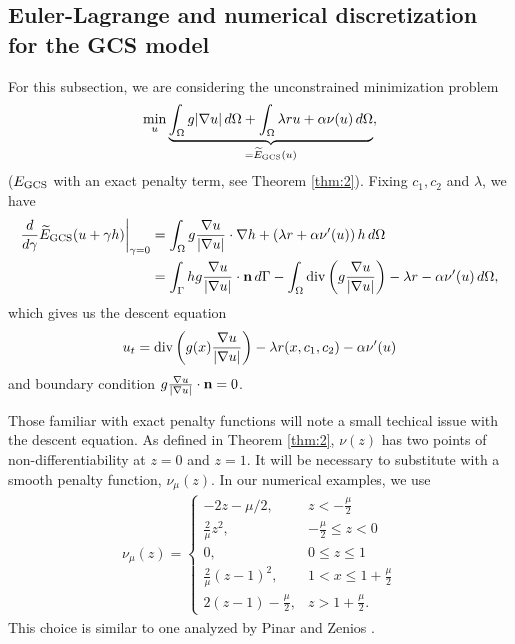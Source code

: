 \subsection{Euler-Lagrange and numerical discretization for the GCS model}
For this subsection, we are considering the unconstrained minimization problem 
\begin{align*}
\min_u \underbrace{\int_{\Omega } g\lvert\nabla u\rvert \,d\Omega 
+ \int_{\Omega} \lambda r u + \alpha \nu(u) \,d\Omega }_{=\widetilde E_{\textrm{GCS}}(u)},
\end{align*}
($E_\textrm{GCS}$ with an exact penalty term, see Theorem \ref{thm:2}).
Fixing $c_1, c_2$ and $\lambda$, we have
\begin{align*}
\frac{d}{d\gamma} \widetilde E_\textrm{GCS}(u + \gamma h)
\bigg\rvert_{\gamma = 0} 
&= \int_{\Omega} g \frac{\nabla u}{\lvert\nabla u\rvert} \cdot \nabla h
+ \left( \lambda r + \alpha \nu'(u) \right) h \,d\Omega 
\\
&= \int_{\Gamma} h g \frac{\nabla u}{\lvert\nabla u\rvert} \cdot \mathbf{n}  \, d \Gamma - \int_{\Omega } \operatorname{div}\left( g \frac{\nabla u}{\lvert\nabla u\rvert} \right) - \lambda r - \alpha \nu'(u) \,d\Omega ,
\end{align*}
which gives us the descent equation 
\begin{align}
\label{eq:gcs_el}
u_t = \operatorname{div}\left( g(x)  \frac{\nabla u}{\lvert\nabla u\rvert} \right) - \lambda r(x,c_1,c_2)- \alpha \nu'(u)
\end{align}
and boundary condition $g\frac{\nabla u}{\lvert\nabla u\rvert} \cdot \mathbf{n} = 0$. 

Those familiar with exact penalty functions will note a small techical issue with the descent equation. As defined in Theorem \ref{thm:2}, $\nu(z)$ has two points of non-differentiability at $z = 0$ and $z = 1$. It will be necessary to substitute with a smooth penalty function, $\nu_\mu(z)$. In our numerical examples, we use
\begin{align*}
\nu_\mu(z) = \begin{cases}
-2z - \mu/2, & z < -\frac{\mu }{2}
\\
\frac{2}{\mu} z^2, &-\frac{\mu}{2} \leq z < 0
\\
0, & 0\leq z \leq 1
\\
\frac{2}{\mu}(z-1)^2, & 1 < x \leq 1 + \frac{\mu }{2}
\\
2(z - 1) - \frac{\mu }{2}, & z > 1+\frac{\mu }{2}.
\end{cases}
\end{align*}
This choice is similar to one analyzed by Pinar and Zenios \cite{pinar1994smoothing}.

